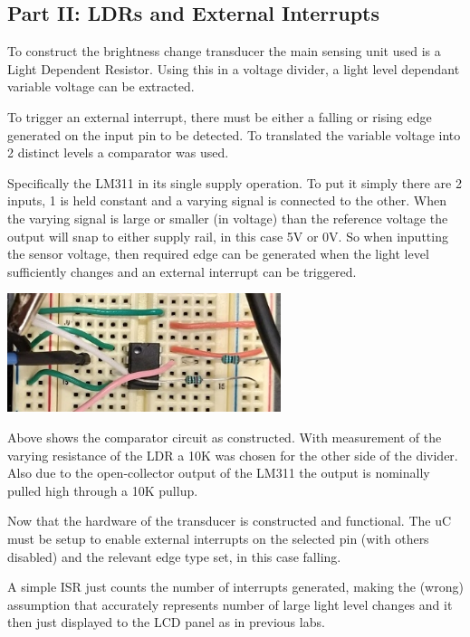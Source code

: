 \documentclass[11pt]{article}
\begin{document}
\begin{preview}
        \subsection{Part II: LDRs and External Interrupts}
        To construct the brightness change transducer the main sensing unit used is a Light Dependent Resistor. Using this in a voltage divider, a light level dependant variable voltage can be extracted.

        To trigger an external interrupt, there must be either a falling or rising edge generated on the input pin to be detected. To translated the variable voltage into 2 distinct levels a comparator was used.

        Specifically the LM311 in its single supply operation. To put it simply there are 2 inputs, 1 is held constant and a varying signal is connected to the other. When the varying signal is large or smaller (in voltage) than the reference voltage the output will snap to either supply rail, in this case 5V or 0V. So when inputting the sensor voltage, then required edge can be generated when the light level sufficiently changes and an external interrupt can be triggered.

        \begin{center}
          \includegraphics[width=0.6\textwidth]{inc/comp.jpg}
        \end{center}

        Above shows the comparator circuit as constructed. With measurement of the varying resistance of the LDR a 10K was chosen for the other side of the divider. Also due to the open-collector output of the LM311 the output is nominally pulled high through a 10K pullup.

        

        Now that the hardware of the transducer is constructed and functional. The uC must be setup to enable external interrupts on the selected pin (with others disabled) and the relevant edge type set, in this case falling.
        
        A simple ISR just counts the number of interrupts generated, making the (wrong) assumption that accurately represents number of large light level changes and it then just displayed to the LCD panel as in previous labs.


\end{preview}
\end{document}

